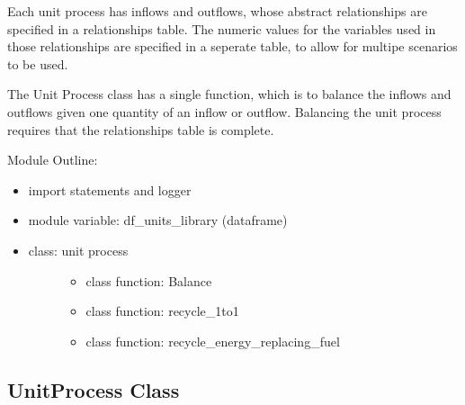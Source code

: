 \documentclass[a4paper,10pt,english]{sphinxmanual}
\begin{document}
Each unit process has inflows and outflows, whose abstract relationships
are specified in a relationships table. The numeric values for the variables
used in those relationships are specified in a seperate table, to allow
for multipe scenarios to be used.

The Unit Process class has a single function, which is to balance the
inflows and outflows given one quantity of an inflow or outflow. Balancing
the unit process requires that the relationships table is complete.

Module Outline:
\begin{itemize}
\item {} 
import statements and logger

\item {} 
module variable: df\_units\_library (dataframe)

\item {} \begin{description}
\item[{class: unit process}] \leavevmode\begin{itemize}
\item {} 
class function: Balance

\item {} 
class function: recycle\_1to1

\item {} 
class function: recycle\_energy\_replacing\_fuel

\end{itemize}

\end{description}

\end{itemize}


\subsection{UnitProcess Class}
\label{\detokenize{unit:unitprocess-class}}
\end{document}
